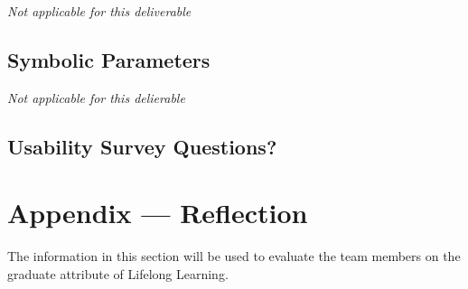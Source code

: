 \documentclass[12pt, titlepage]{article}
\begin{document}
\textit{Not applicable for this deliverable}

\subsection{Symbolic Parameters}

\textit{Not applicable for this delierable}

\subsection{Usability Survey Questions?}


\newpage{}
\section*{Appendix --- Reflection}


The information in this section will be used to evaluate the team members on the
graduate attribute of Lifelong Learning.


\end{document}
